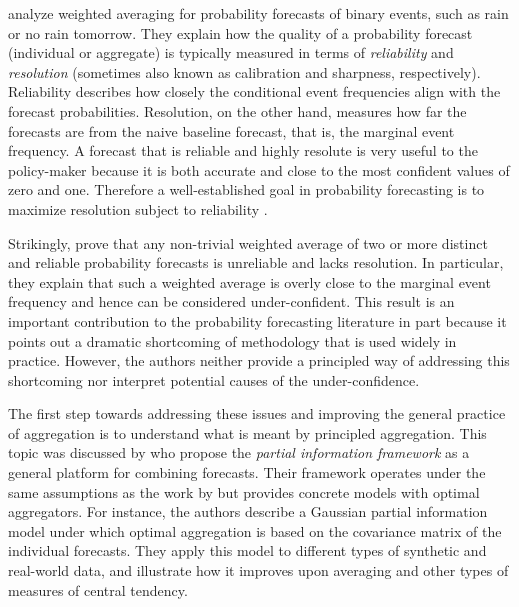 \documentclass[11pt]{article}
\theoremstyle{definition}
\theoremstyle{definition}
\begin{document}
\cite{Ranjan08} analyze weighted averaging for probability forecasts of binary events, such as rain or no
rain tomorrow. They explain how the quality of a probability forecast
(individual or aggregate) is typically measured in terms of
\textit{reliability} and \textit{resolution} (sometimes also known as calibration and
sharpness, respectively). Reliability describes how closely the
conditional event frequencies align with the forecast
probabilities. Resolution, on the other hand, measures how far the
forecasts are from the naive baseline forecast, that is, the marginal
event frequency. A forecast that is reliable and highly resolute is
very useful to the policy-maker because it is both accurate and close
to the most confident values of zero and one. Therefore a
well-established goal in probability forecasting is to maximize resolution subject to
reliability \citep{murphy1987general, gneiting2007probabilistic}.


Strikingly, \cite{Ranjan08} prove that any non-trivial weighted average
of two or more distinct and reliable probability forecasts is
unreliable and lacks resolution. In particular, they explain that such
a weighted average is overly
close to the marginal event frequency and hence can be considered under-confident.  This result is an important
contribution to the probability forecasting literature in part
because it points out a dramatic shortcoming of methodology that is
used widely in practice. However, the authors neither provide a
principled way of addressing this shortcoming nor interpret potential causes of the under-confidence. 




The first step towards addressing these issues and improving the general practice of aggregation  is to understand what is meant by principled aggregation. This topic was discussed by \cite{satopaamodeling2, satopaamodeling} who propose the \textit{partial information 
framework} as a general platform for combining forecasts. Their framework operates under the same assumptions as the work by \cite{Ranjan08} but provides concrete models with optimal aggregators. 
For instance, the authors describe a Gaussian partial information model under which optimal aggregation is based on the covariance matrix of the individual forecasts. They apply this model to different types of synthetic and real-world data, and illustrate how it improves upon averaging and other types of measures of central tendency. 
%
\end{document}
